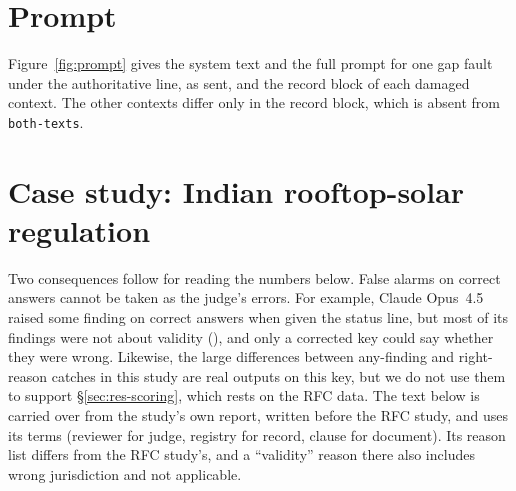 \section{Prompt}
\label{app:prompt-rfc}
\setcounter{table}{0}\setcounter{figure}{0}
Figure~\ref{fig:prompt} gives the system text and the full prompt for one gap fault under the authoritative line, as sent, and the record
block of each damaged context. The other contexts differ only in the record block, which is absent from
\texttt{both-texts}.


\clearpage
\section{Case study: Indian rooftop-solar regulation}
\label{app:case}
\setcounter{table}{0}\setcounter{figure}{0}

\noindent{}
\medskip

Two consequences follow for reading the numbers below. False alarms on correct answers cannot be taken as the judge's
errors. For example, Claude Opus~4.5 raised some finding on \RobFlaggedClaudeOpusRFour{} correct answers when given the
status line, but most of its findings were not about validity (\RobNonValidityClaudeOpus), and only a corrected key
could say whether they were wrong. Likewise, the large differences between any-finding and right-reason catches in this
study are real outputs on this key, but we do not use them to support \S\ref{sec:res-scoring}, which rests on the RFC
data. The text below is carried over from the study's own report, written before the RFC study, and uses its terms
(reviewer for judge, registry for record, clause for document). Its reason list differs from the RFC study's, and
a ``validity'' reason there also includes wrong jurisdiction and not applicable.

